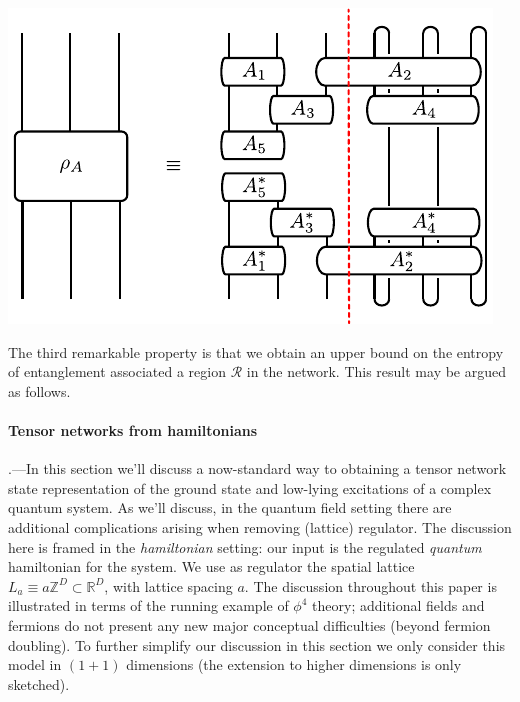 \documentclass[prl,twocolumn,lengthcheck,superscriptaddress]{revtex4-1}
\theoremstyle{definition}
\theoremstyle{remark}
\begin{document}
\begin{center} 
\includegraphics{ptrace.pdf}
\end{center}

The third remarkable property is that we obtain an upper bound on the entropy of entanglement associated a region $\mathcal{R}$ in the network. This result may be argued as follows.  

\paragraph{Tensor networks from hamiltonians}\hspace{-1em}.---In this section we'll discuss a now-standard way to obtaining a tensor network state representation of the ground state and low-lying excitations of a complex quantum system. As we'll discuss, in the quantum field setting there are additional complications arising when removing (lattice) regulator. The discussion here is framed in the \emph{hamiltonian} setting: our input is the regulated \emph{quantum} hamiltonian for the system. We use as regulator the spatial lattice $L_a \equiv a\mathbb{Z}^D\subset \mathbb{R}^D$, with lattice spacing $a$. The discussion throughout this paper is illustrated in terms of the running example of $\phi^4$ theory; additional fields and fermions do not present any new major conceptual difficulties (beyond fermion doubling). To further simplify our discussion in this section we only consider this model in $(1+1)$ dimensions (the extension to higher dimensions is only sketched). 
\end{document}
